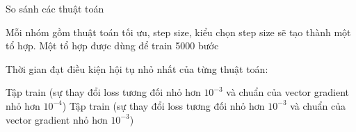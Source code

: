 \documentclass[10pt]{beamer}
\theoremstyle{remark}
\theoremstyle{definition}
\begin{document}
\begin{frame}{So sánh các thuật toán}
	\begin{figure}[!htp]
		\hfill
	  \end{figure}

	Mỗi nhóm gồm thuật toán tối ưu, step size, kiểu chọn step size sẽ tạo thành một tổ hợp.
	Một tổ hợp được dùng để train 5000 bước

	Thời gian đạt điều kiện hội tụ nhỏ nhất của từng thuật toán:
	

	Tập train (sự thay đổi loss tương đối nhỏ hơn $10^{-3}$ và chuẩn của vector gradient nhỏ hơn $10^{-4}$)
	Tập train (sự thay đổi loss tương đối nhỏ hơn $10^{-3}$ và chuẩn của vector gradient nhỏ hơn $10^{-3}$)

\end{frame}
\end{document}
